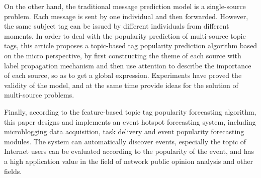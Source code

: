 On the other hand, the traditional message prediction model is a single-source problem. Each message is sent by one individual and then forwarded. However, the same subject tag can be issued by different individuals from different moments. In order to deal with the popularity prediction of multi-source topic tags, this article proposes a topic-based tag popularity prediction algorithm based on the micro perspective, by first constructing the theme of each source with label propagation mechanism and then use attention to describe the importance of each source, so as to get a global expression. Experiments have proved the validity of the model, and at the same time provide ideas for the solution of multi-source problems.

Finally, according to the feature-based topic tag popularity forecasting algorithm,
this paper designs and implements an event hotspot forecasting system, including microblogging data acquisition, task delivery and event popularity forecasting modules. The system can automatically discover events, especially the topic of Internet users can be evaluated according to the popularity of the event, and has a high application value in the field of network public opinion analysis and other fields.

